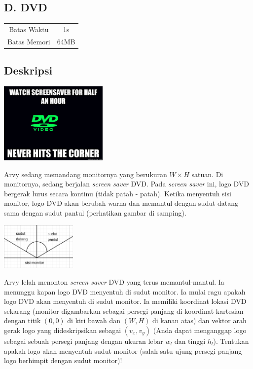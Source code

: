 \documentclass{article}
\begin{document}
\begin{center}
    \section*{D. DVD}

    \begin{tabular}{ | c c | }
        \hline
        Batas Waktu  & 1s \\
        Batas Memori & 64MB \\
        \hline
    \end{tabular}
\end{center}

\subsection*{Deskripsi}

\begin{center}
    \includegraphics[width=200px]{meme}
\end{center}

\begin{multicols}{2}

Arvy sedang memandang monitornya yang berukuran $W \times H$ satuan.
Di monitornya, sedang berjalan \textit{screen saver} DVD.
Pada \textit{screen saver} ini, logo DVD bergerak lurus secara kontinu (tidak patah - patah).
Ketika menyentuh sisi monitor, logo DVD akan berubah warna dan memantul dengan sudut datang sama dengan sudut pantul (perhatikan gambar di samping).

\begin{center}
    \includegraphics[width=140px]{pantul}
\end{center}
\end{multicols}

Arvy lelah menonton \textit{screen saver} DVD yang terus memantul-mantul.
Ia menunggu kapan logo DVD menyentuh di sudut monitor.
Ia mulai ragu apakah logo DVD akan menyentuh di sudut monitor.
Ia memiliki koordinat lokasi DVD sekarang (monitor digambarkan sebagai persegi panjang di koordinat kartesian dengan titik $(0, 0)$ di kiri bawah dan $(W, H)$ di kanan atas) dan vektor arah gerak logo yang dideskripsikan sebagai $(v_x, v_y)$ (Anda dapat menganggap logo sebagai sebuah persegi panjang dengan ukuran lebar $w_l$ dan tinggi $h_l$).
Tentukan apakah logo akan menyentuh sudut monitor (salah satu ujung persegi panjang logo berhimpit dengan sudut monitor)!
\end{document}
